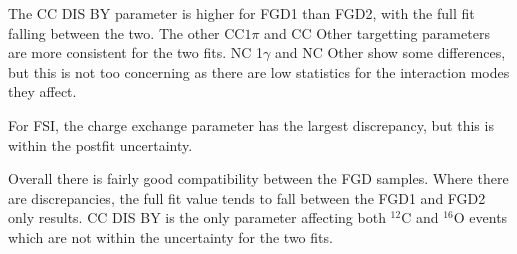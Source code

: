 The CC DIS BY parameter is higher for FGD1 than FGD2, with the full fit falling between the two. The other CC$ 1\pi$ and CC Other targetting parameters are more consistent for the two fits. NC 1$\gamma$ and NC Other show some differences, but this is not too concerning as there are low statistics for the interaction modes they affect.

For FSI, the charge exchange parameter has the largest discrepancy, but this is within the postfit uncertainty.

Overall there is fairly good compatibility between the FGD samples. Where there are discrepancies, the full fit value tends to fall between the FGD1 and FGD2 only results. CC DIS BY is the only parameter affecting both $^{12}$C and $^{16}$O events which are not within the uncertainty for the two fits. 

